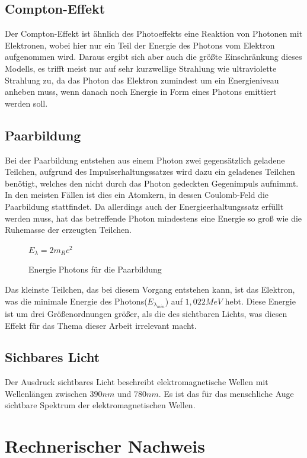 \documentclass[11pt,a4paper,oneside]{report}
\begin{document}
\section{Compton-Effekt}
Der Compton-Effekt ist ähnlich des Photoeffekts eine Reaktion von Photonen mit Elektronen, wobei hier nur ein Teil der Energie des Photons vom Elektron aufgenommen wird. Daraus ergibt sich aber auch die größte Einschränkung dieses Modells, es trifft meist nur auf sehr kurzwellige Strahlung wie ultraviolette Strahlung zu\cite{stroppe08}, da das Photon das Elektron zumindest um ein Energieniveau anheben muss, wenn danach noch Energie in Form eines Photons emittiert werden soll.

\section{Paarbildung}
Bei der Paarbildung entstehen aus einem Photon zwei gegensätzlich geladene Teilchen, aufgrund des Impulserhaltungssatzes wird dazu ein geladenes Teilchen benötigt, welches den nicht durch das Photon gedeckten Gegenimpuls aufnimmt. In den meisten Fällen ist dies ein Atomkern, in dessen Coulomb-Feld die Paarbildung stattfindet. Da allerdings auch der Energieerhaltungssatz erfüllt werden muss, hat das betreffende Photon mindestens eine Energie so groß wie die Ruhemasse der erzeugten Teilchen.
\begin{figure}[ht]
\centering
$E_{\lambda} = 2m_Rc^2$
 \caption{Energie Photons für die Paarbildung\cite[S. 457f]{stroppe08}}
\end{figure}

Das kleinste Teilchen, das bei diesem Vorgang entstehen kann, ist das Elektron, was die minimale Energie des Photons($E_{\lambda_{min}}$) auf $1,022MeV$ hebt\cite[S.458]{stroppe08}. Diese Energie ist um drei Größenordnungen größer, als die des sichtbaren Lichts, was diesen Effekt für das Thema dieser Arbeit irrelevant macht.

\section{Sichbares Licht}
Der Ausdruck sichtbares Licht beschreibt elektromagnetische Wellen mit Wellenlängen zwischen $390nm$ und $780nm$. Es ist das für das menschliche Auge sichtbare Spektrum der elektromagnetischen Wellen.

\pagebreak

\chapter{Rechnerischer Nachweis}
\end{document}
